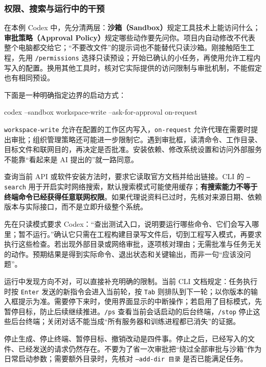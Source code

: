 \subsubsection{权限、搜索与运行中的干预}

在本例 Codex 中，先分清两层：\textbf{沙箱（Sandbox）}规定工具技术上能访问什么；\textbf{审批策略（Approval Policy）}规定哪些动作要先问你。项目内自动修改不代表整个电脑都交给它；“不要改文件”的提示词也不能替代只读沙箱。刚接触陌生工程，先用 \texttt{/permissions} 选择只读预设；开始已确认的小任务，再使用允许工程内写入的配置。换用其他工具时，核对它实际提供的访问限制与审批机制，不能假定也有相同预设。

下面是一种明确指定边界的启动方式：
\begin{tbash}
codex --sandbox workspace-write --ask-for-approval on-request
\end{tbash}
\texttt{workspace-write} 允许在配置的工作区内写入，\texttt{on-request} 允许代理在需要时提出审批；组织管理策略还可能进一步限制它。遇到审批框，读清命令、工作目录、目标文件和联网目的，再决定是否批准。安装依赖、修改系统设置和访问外部服务不能靠“看起来是 AI 提出的”就一路同意。

查询当前 API 或软件安装方法时，要求它读取官方文档并给出链接。CLI 的 \texttt{--search} 用于开启实时网络搜索，默认搜索模式可能使用缓存；\textbf{有搜索能力不等于终端命令已经获得任意联网权限}。如果代理说资料已过时，先核对来源日期、依赖版本与实际接口，而不是立即升级整个系统。

\begin{example}[只给当前任务需要的权限]
先在只读模式要求 Codex：“查出测试入口，说明要运行哪些命令、它们会写入哪里；暂不运行。”确认它只需在工程构建目录写文件后，切到工程写入模式，再要求执行这些检查。若出现外部目录或网络审批，逐项核对理由；无需批准与任务无关的动作。预期结果是得到实际命令、退出状态和关键输出，而非一句“应该没问题”。
\end{example}

运行中发现方向不对，可以直接补充明确的限制。当前 CLI 文档规定：任务执行时按 \texttt{Enter} 发送的新指令会进入当前轮，按 \texttt{Tab} 则排队到下一轮；以你版本的输入框提示为准。需要停下来时，使用界面显示的中断操作；若启用了目标模式，先暂停目标，防止后续继续推进。\texttt{/ps} 查看当前会话启动的后台终端，\texttt{/stop} 停止这些后台终端；关闭对话不能当成“所有服务器和训练进程都已消失”的证据。

\begin{note}
停止生成、停止终端、暂停目标、撤销改动是四件事。停止之后，已经写入的文件、已经发送的请求仍然存在。不要为了省一次审批把“绕过全部审批与沙箱”作为日常启动参数；需要额外目录时，先核对 \texttt{--add-dir 目录} 是否已能满足任务。
\end{note}

